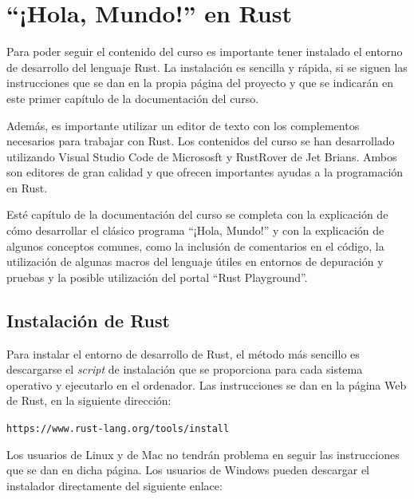 \chapter{``¡Hola, Mundo!'' en Rust}
\label{ch_hola_mundo}
\IndiceCapitulo

\begin{Resumen}
Para poder seguir el contenido del curso es importante tener instalado el entorno de desarrollo del lenguaje Rust. La instalación es sencilla y rápida, si se siguen las instrucciones que se dan en la propia página del proyecto y que se indicarán en este primer capítulo de la documentación del curso. 

\smallskip

Además, es importante utilizar un editor de texto con los complementos necesarios para trabajar con Rust. Los contenidos del curso se han desarrollado utilizando Visual Studio Code de Micrososft y RustRover de Jet Brians. Ambos son editores de gran calidad y que ofrecen importantes ayudas a la programación en Rust.

\smallskip

Esté capítulo de la documentación del curso se completa con la explicación de cómo desarrollar el clásico programa ``¡Hola, Mundo!'' y con la explicación de algunos conceptos comunes, como la inclusión de comentarios en el código, la utilización de algunas macros del lenguaje útiles en entornos de depuración y pruebas y la posible utilización del portal ``Rust Playground''.
\end{Resumen}

\section{Instalación de Rust}
\noindent Para instalar el entorno de desarrollo de Rust, el método más sencillo es descargarse el \textit{script} de instalación que se proporciona para cada sistema operativo y ejecutarlo en el ordenador. Las instrucciones se dan en la página Web de Rust, en la siguiente dirección:

{\centering \small \texttt{https://www.rust-lang.org/tools/install} \par}

Los usuarios de Linux y de Mac no tendrán problema en seguir las instrucciones que se dan en dicha página. Los usuarios de Windows pueden descargar el instalador directamente del siguiente enlace:

